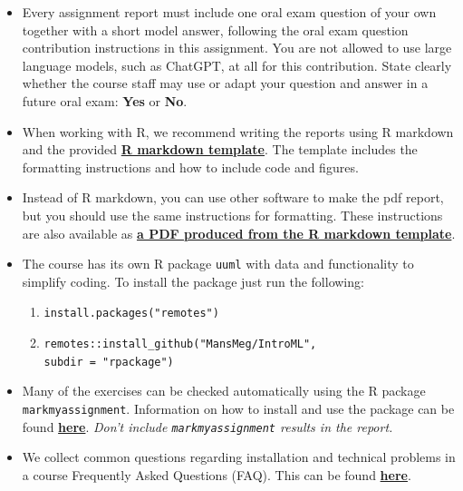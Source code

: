 \begin{itemize}
\item Every assignment report must include one oral exam question of your own together with a short model answer, following the oral exam question contribution instructions in this assignment. You are not allowed to use large language models, such as ChatGPT, at all for this contribution. State clearly whether the course staff may use or adapt your question and answer in a future oral exam: \textbf{Yes} or \textbf{No}.

\item When working with R, we recommend writing the reports using R markdown and the provided \href{https://raw.githubusercontent.com/MansMeg/IntroML/master/templates/assignment_template.rmd}{\textbf{R markdown template}}. The template includes the formatting instructions and how to include code and figures.

\item Instead of R markdown, you can use other software to make the pdf report, but you should use the same instructions for formatting. These instructions are also available as \href{https://raw.githubusercontent.com/MansMeg/IntroML/master/templates/assignment_template.pdf}{\textbf{a PDF produced from the R markdown template}}.

\item The course has its own R package \texttt{uuml} with data and functionality to simplify coding. To install the package just run the following:
\begin{enumerate}
\item \texttt{install.packages("remotes")}
\item \texttt{remotes::install\_github("MansMeg/IntroML", \\ subdir = "rpackage")}
\end{enumerate}

\item Many of the exercises can be checked automatically using the R package \\ \texttt{markmyassignment}. Information on how to install and use the package can be found \href{https://cran.r-project.org/web/packages/markmyassignment/vignettes/markmyassignment.html}{\textbf{here}}. \emph{Don't include \texttt{markmyassignment} results in the report.}

\item We collect common questions regarding installation and technical problems in a course Frequently Asked Questions (FAQ). This can be found \href{https://github.com/MansMeg/IntroML/blob/master/FAQ.md}{\textbf{here}}.


\end{itemize}
